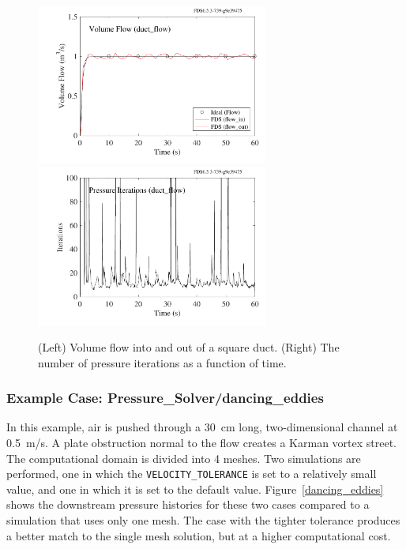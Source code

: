 \documentclass[11pt]{book}
\newcommand{\ct}{\tt\small}
\begin{document}
\begin{figure}[ht]
\begin{center}
\includegraphics[width=3in]{SCRIPT_FIGURES/duct_flow}
\includegraphics[width=3in]{SCRIPT_FIGURES/duct_flow_iterations}
\end{center}
\caption[Results of the {\ct duct\_flow} test case]{(Left) Volume flow into and out of a square duct. (Right) The number of pressure iterations as a function of time.}
\label{duct_flow}
\end{figure}


\subsubsection{Example Case: Pressure\_Solver/dancing\_eddies}

In this example, air is pushed through a 30~cm long, two-dimensional channel at 0.5~m/s. A plate obstruction normal to the flow creates a Karman vortex street. The computational domain is divided into 4 meshes. Two simulations are performed, one in which the {\ct VELOCITY\_TOLERANCE} is set to a relatively small value, and one in which it is set to the default value. Figure~\ref{dancing_eddies} shows the downstream pressure histories for these two cases compared to a simulation that uses only one mesh. The case with the tighter tolerance produces a better match to the single mesh solution, but at a higher computational cost.
\end{document}
